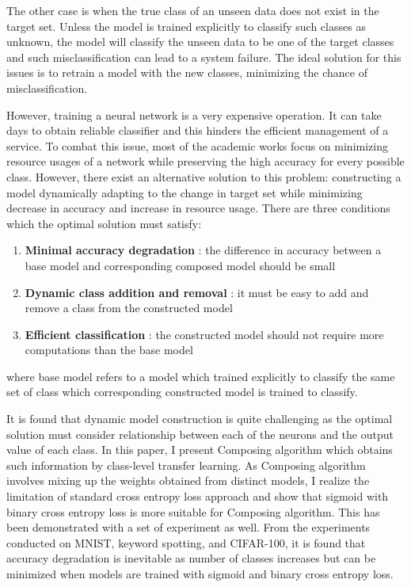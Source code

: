 \documentclass{article}
\begin{document}
The other case is when the true class of an unseen data does not exist in the target set. Unless the model is trained explicitly to classify such classes as unknown, the model will classify the unseen data to be one of the target classes and such misclassification can lead to a system failure. The ideal solution for this issues is to retrain a model with the new classes, minimizing the chance of misclassification.

However, training a neural network is a very expensive operation. It can take days to obtain reliable classifier and this hinders the efficient management of a service. To combat this issue, most of the academic works focus on minimizing resource usages of a network while preserving the high accuracy for every possible class. However, there exist an alternative solution to this problem: constructing a model dynamically adapting to the change in target set while minimizing decrease in accuracy and increase in resource usage. There are three conditions which the optimal solution must satisfy:

\begin{enumerate}
    \item \textbf{Minimal accuracy degradation} : the difference in accuracy between a base model and corresponding composed model should be small
    \item \textbf{Dynamic class addition and removal} : it must be easy to add and remove a class from the constructed model
    \item \textbf{Efficient classification} : the constructed model should not require more computations than the base model
\end{enumerate}

where base model refers to a model which trained explicitly to classify the same set of class which corresponding constructed model is trained to classify.

It is found that dynamic model construction is quite challenging as the optimal solution must consider relationship between each of the neurons and the output value of each class. In this paper, I present Composing algorithm which obtains such information by class-level transfer learning. As Composing algorithm involves mixing up the weights obtained from distinct models, I realize the limitation of standard cross entropy loss approach and show that sigmoid with binary cross entropy loss is more suitable for Composing algorithm. This has been demonstrated with a set of experiment as well. From the experiments conducted on MNIST, keyword spotting, and CIFAR-100, it is found that accuracy degradation is inevitable as number of classes increases but can be minimized when models are trained with sigmoid and binary cross entropy loss.
\end{document}
